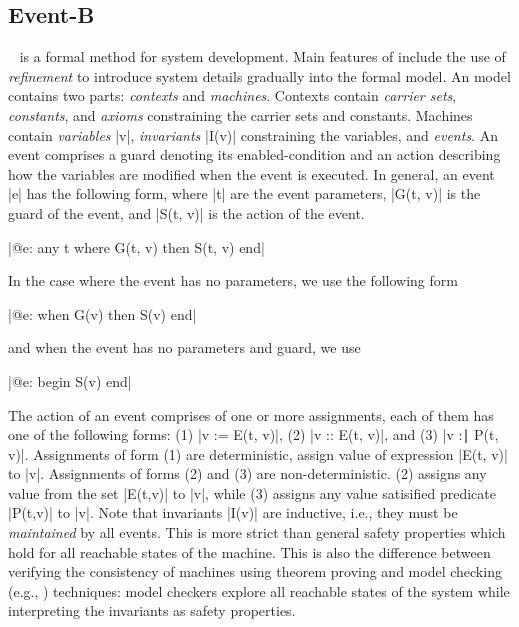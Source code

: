 
\subsection{Event-B}
\label{sec:eventb}

\EventB~\cite{abrial10:_model_event_b} is a formal method for system
development.  Main features of \EventB include the use of
\emph{refinement} to introduce system details gradually into the
formal model.  An \EventB model contains two parts: \emph{contexts} and \emph{machines}. Contexts contain \emph{carrier sets}, \emph{constants}, and \emph{axioms} constraining the carrier sets and constants.  Machines contain \emph{variables} |v|, \emph{invariants} |I(v)| constraining the variables, and \emph{events}. An event comprises a guard denoting its enabled-condition and an action describing how the variables are modified when the event is executed.  In general, an event |e| has the following form, where |t| are the event parameters, |G(t, v)| is the guard of the event, and |S(t, v)| is the action of the event.
\begin{center}
  |@e: any t where G(t, v) then S(t, v) end|
\end{center}
In the case where the event has no parameters, we use the following form
\begin{center}
  |@e: when G(v) then S(v) end|
\end{center}
and when the event has no parameters and guard, we use
\begin{center}
  |@e: begin S(v) end|
\end{center}
The action of an event comprises of one or more assignments, each of them has one of the following forms: (1) |v := E(t, v)|, (2) |v :: E(t, v)|, and (3) |v :∣ P(t, v)|.  Assignments of form (1) are deterministic, assign value of expression |E(t, v)| to |v|.  Assignments of forms (2) and (3) are non-deterministic. (2) assigns any value from the set |E(t,v)| to |v|, while (3) assigns any value satisified predicate |P(t,v)| to |v|.
Note that invariants |I(v)| are inductive, i.e., they must be \emph{maintained} by all events. This is more strict than general safety properties which hold for all reachable states of the \EventB machine.  This is also the difference between verifying the consistency of \EventB machines using theorem proving and model checking (e.g., \PROB) techniques: model checkers explore all reachable states of the system while interpreting the invariants as safety properties.

